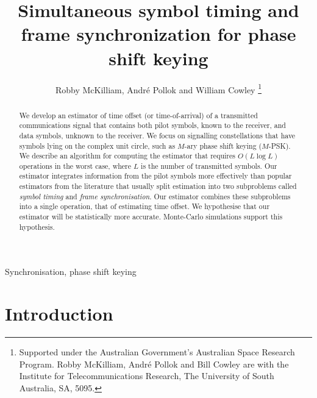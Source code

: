 \documentclass[journal]{IEEEtranTCOM}
\title{Simultaneous symbol timing and frame synchronization for phase shift keying}
\author{Robby McKilliam, Andr\'{e} Pollok and William Cowley  
\thanks{
Supported under the Australian Government's Australian Space Research Program.
Robby McKilliam, Andr\'{e} Pollok and Bill Cowley are with the Institute for Telecommunications Research, The University of South Australia, SA, 5095.}
}
\begin{document}
\maketitle

\begin{abstract}
We develop an estimator of time offset (or time-of-arrival) of a transmitted communications signal that contains both pilot symbols, known to the receiver, and data symbols, unknown to the receiver.  We focus on signalling constellations that have symbols lying on the complex unit circle, such as $M$-ary phase shift keying ($M$-PSK).  We describe an algorithm for computing the estimator that requires $O(L\log L)$ operations in the worst case, where $L$ is the number of transmitted symbols.  Our estimator integrates information from the pilot symbols more effectively than popular estimators from the literature that usually split estimation into two subproblems called \emph{symbol timing} and \emph{frame synchronisation}. Our estimator combines these subproblems into a single operation, that of estimating time offset.  %
We hypothesise that our estimator will be statistically more accurate. Monte-Carlo simulations support this hypothesis.
\end{abstract}
\begin{IEEEkeywords}
Synchronisation, phase shift keying
\end{IEEEkeywords}


\section{Introduction}
\end{document}
